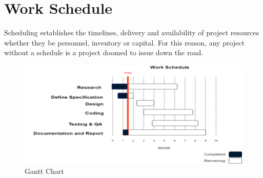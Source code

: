 \section{Work Schedule}
Scheduling establishes the timelines, delivery and availability of project resources whether they be personnel, inventory or capital. For this reason, any project without a schedule is a project doomed to issue down the road.

\begin{figure}[H]
	\centering
	\includegraphics[width=160mm]{images/ganttchart.png}
	\caption{Gantt Chart} %
	\label{figganttchart} %
\end{figure}




\renewcommand\bibname{References} %



